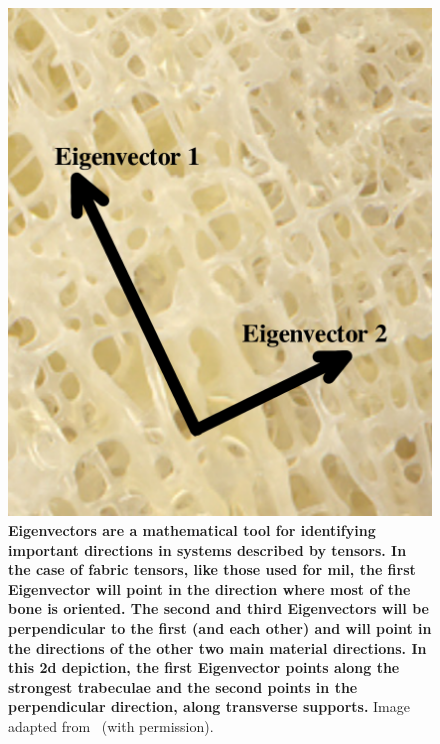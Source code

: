 \begin{figure}
\includegraphics[width=\hsize]{./intro/Figures/Ascenzi_trabec_eigenvectors}
\caption[\acs*{mil} of a \acs*{2d} section]{\textbf{Eigenvectors are a mathematical tool for identifying important directions in systems described by tensors. In the case of fabric tensors, like those used for \ac{mil}, the first Eigenvector will point in the direction where most of the bone is oriented. The second and third Eigenvectors will be perpendicular to the first (and each other) and will point in the directions of the other two main material directions. In this \acs{2d} depiction, the first Eigenvector points along the strongest trabeculae and the second points in the perpendicular direction, along transverse supports.} Image adapted from~\citet{ascenzi_variation_2011} (with permission).}
\label{fig:Eigenvectors}
\end{figure}

